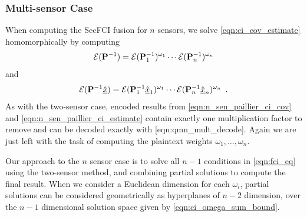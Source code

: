 % 
% 

\subsubsection{Multi-sensor Case} \label{sec:multi_secfci}
When computing the SecFCI fusion for $n$ sensors, we solve \eqref{eqn:ci_cov_estimate} homomorphically by computing
\begin{equation}
   \mathcal{E}({{\mathbf{P}}}^{-1}) = \mathcal{E}({{\mathbf{P}}}^{-1}_1)^{\omega_1}\cdots\mathcal{E}({{\mathbf{P}}}^{-1}_n)^{\omega_n} \label{eqn:n_sen_paillier_ci_cov}
\end{equation}
and
\begin{equation}
   \mathcal{E}({{\mathbf{P}}}^{-1}\hat{{\underline{x}}}) = \mathcal{E}({{\mathbf{P}}}^{-1}_1\hat{{\underline{x}}}_1)^{\omega_1}\cdots\mathcal{E}({{\mathbf{P}}}^{-1}_n\hat{{\underline{x}}}_n)^{\omega_n}\enspace. \label{eqn:n_sen_paillier_ci_estimate}
\end{equation}
As with the two-sensor case, encoded results from \eqref{eqn:n_sen_paillier_ci_cov} and \eqref{eqn:n_sen_paillier_ci_estimate} contain exactly one multiplication factor to remove and can be decoded exactly with [eqn:qmn\_mult\_decode]. Again we are just left with the task of computing the plaintext weights $\omega_1,\dots,\omega_n$.

Our approach to the $n$ sensor case is to solve all $n-1$ conditions in \eqref{eqn:fci_eq} using the two-sensor method, and combining partial solutions to compute the final result. When we consider a Euclidean dimension for each $\omega_i$, partial solutions can be considered geometrically as hyperplanes of $n-2$ dimension, over the $n-1$ dimensional solution space given by \eqref{eqn:ci_omega_sum_bound}. 

